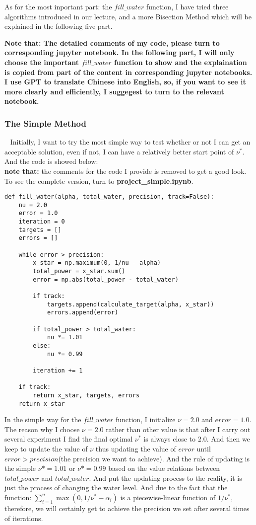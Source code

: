 \documentclass[a4paper,12pt]{article}
\begin{document}
    As for the most inportant part: the $fill\_water$ function, I have tried three algorithms introduced in our lecture, and a more Bisection Method which will be explained in the following five part.
    
    \vspace*{0.5cm}
    \textbf{Note that: The detailed comments of my code, please turn to corresponding jupyter notebook. In the following part, I will only choose the important $fill\_water$ function to show and the explaination is copied from part of the content in corresponding jupyter notebooks. I use GPT to translate Chinese into English, so, if you want to see it more clearly and efficiently, I suggegest to turn to the relevant notebook.}
    \subsubsection{The Simple Method} 
    \
    \newline
    \indent Initially, I want to try the most simple way to test whether or not I can get an acceptable solution, even if not, I can have a relatively better start point of $\nu^*$. And the code is showed below:
    \\
    \textbf{note that:} the comments for the code I provide is removed to get a good look. To see the complete version, turn to \textbf{project\_simple.ipynb}.
\begin{lstlisting}
def fill_water(alpha, total_water, precision, track=False):
    nu = 2.0
    error = 1.0
    iteration = 0
    targets = []
    errors = []

    while error > precision:
        x_star = np.maximum(0, 1/nu - alpha)
        total_power = x_star.sum()
        error = np.abs(total_power - total_water)
        
        if track:
            targets.append(calculate_target(alpha, x_star))
            errors.append(error)
        
        if total_power > total_water:
            nu *= 1.01
        else:
            nu *= 0.99
 
        iteration += 1
        
    if track:
        return x_star, targets, errors
    return x_star
\end{lstlisting}
    
    In the simple way for the $fill\_water$ function, I initialize $\nu = 2.0$ and $error = 1.0$. The reason why I choose $\nu = 2.0$ rather than other value is that after I carry out several experiment I find the final optimal $\nu^*$ is always close to $2.0$. And then we keep to update the value of $\nu$ thus updating the value of $error$ until $error > precision$(the precision we want to achieve). And the rule of updating is the simple $\nu *= 1.01$ or $\nu *= 0.99$ based on the value relations between $total\_power$ and $total\_water$.
    And put the updating process to the reality, it is just the process of changing the water level. And due to the fact that the function: $\sum_{i=1}^{n} \max(0,1/\nu^*-\alpha_i)$ is a piecewise-linear function of $1/\nu^*$, therefore, we will certainly get to achieve the precision we set after several times of iterations.
\end{document}
